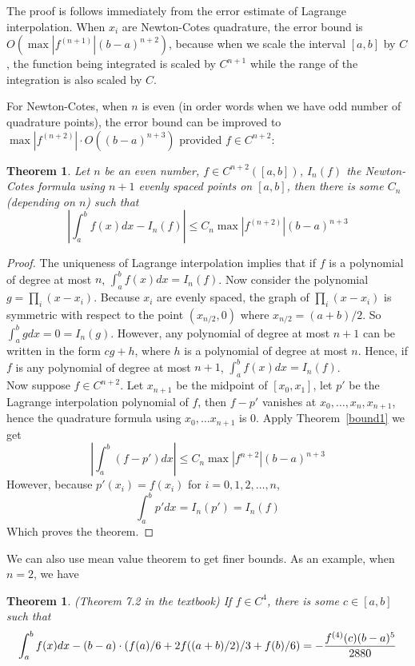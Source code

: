 \documentclass{article} %
\theoremstyle{break}
\newtheorem{thm}[definition]{Theorem}
\begin{document}
The proof is follows immediately from the error estimate of Lagrange interpolation. When $x_i$ are Newton-Cotes quadrature, the error bound is $O(\max|f^{(n+1)}|(b-a)^{n+2})$, because when we scale the interval $[a, b]$ by $C$, the function being integrated is scaled by $C^{n+1}$ while the range of the integration is also scaled by $C$.


For Newton-Cotes, when $n$ is even (in order words when we have odd number of quadrature points), the error bound can be improved to $\max|f^{(n+2)}|\cdot O((b-a)^{n+3})$ provided $f\in C^{n+2}$:

\begin{thm}\label{qbound} Let $n$ be an even number, $f\in C^{n+2}([a, b])$, $I_n(f)$ the Newton-Cotes formula using $n+1$ evenly spaced points on $[a, b]$, then there is some $C_n$ (depending on $n$) such that
  \[|\int_a^bf(x)dx-I_n(f)|\leq C_n\max|f^{(n+2)}|(b-a)^{n+3}\]
\end{thm}
\begin{proof}
  The uniqueness of Lagrange interpolation implies that if $f$ is a polynomial of degree at most $n$, $\int_a^bf(x)dx=I_n(f)$. Now consider the polynomial $g=\prod_i(x-x_i)$. Because $x_i$ are evenly spaced, the graph of $\prod_i(x-x_i)$ is symmetric with respect to the point $(x_{n/2}, 0)$ where $x_{n/2}=(a+b)/2$. So $\int_a^bgdx=0=I_n(g)$. However, any polynomial of degree at most $n+1$ can be written in the form $cg+h$, where $h$ is a polynomial of degree at most $n$. Hence, if $f$ is any polynomial of degree at most $n+1$, $\int_a^bf(x)dx=I_n(f)$.\\

  
  Now suppose $f\in C^{n+2}$. Let $x_{n+1}$ be the midpoint of $[x_0, x_1]$, let $p'$ be the Lagrange interpolation polynomial of $f$, then $f-p'$ vanishes at $x_0, \dots, x_n, x_{n+1}$, hence the quadrature formula using $x_0, \dots x_{n+1}$ is $0$. Apply Theorem~\ref{bound1} we get
  \[|\int_a^b(f-p')dx|\leq C_n\max|f^{n+2}|(b-a)^{n+3}\]
  However, because $p'(x_i)=f(x_i)$ for $i=0, 1, 2, \dots, n$,
  \[\int_a^bp'dx=I_n(p')=I_n(f)\]
  Which proves the theorem.
\end{proof}


We can also use mean value theorem to get finer bounds. As an example, when $n=2$, we have

\begin{thm}(Theorem 7.2 in the textbook) If $f\in C^4$, there is some $c\in [a, b]$ such that
  \[\int_a^b f(x)dx-(b-a)\cdot(f(a)/6+2f((a+b)/2)/3+f(b)/6)=-{f^{(4)}(c)(b-a)^5\over 2880}\]
\end{thm}
\end{document}
